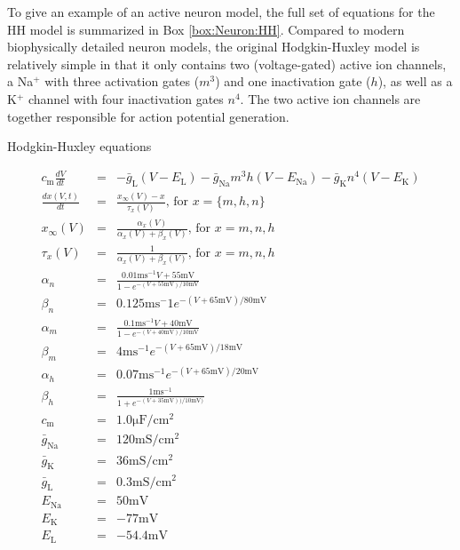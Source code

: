 To give an example of an active neuron model, the full set of equations for the HH model is summarized in Box \ref{box:Neuron:HH}. Compared to modern biophysically detailed neuron models, the original Hodgkin-Huxley model is relatively simple in that it only contains two (voltage-gated) active ion channels, a Na$^+$ with three activation gates ($m^3$) and one inactivation gate ($h$), as well as a K$^+$ channel with four inactivation gates $n^4$. The two active ion channels are together responsible for action potential generation.  

\begin{floatingbox}[h]
\caption{Hodgkin-Huxley equations}

\begin{eqnarray*}
    c_{\mathrm{m}} \frac{dV}{dt} & =  & -\bar{g}_{\mathrm{L}}(V-E_{\mathrm{L}}) - \bar{g}_{\mathrm{Na}} m^3 h (V - E_{\mathrm{Na}}) - \bar{g}_{\mathrm{K}} n^4 (V - E_{\mathrm{K}}) \\
    \frac{dx(V,t)}{dt} & = & \frac{x_{\infty}(V) - x}{\tau_x(V)},  \, \text{for } x = \{m,h,n\} \\ 
    x_{\infty}(V) &= & \frac{\alpha_x(V)}{\alpha_x(V) + \beta_x(V)}, \, \text{for } x = m,n,h \\ %
    \tau_x(V) & = & \frac{1}{\alpha_x(V) + \beta_x(V)}, \, \text{for } x = m,n,h \\ %
    \alpha_n &=& \frac{0.01 \mathrm{ms}^{-1} V+55 \mathrm{mV}}{1-e^{-(V+55 \mathrm{mV})/10 \mathrm{mV}}}  \\ %
     \beta_n &=& 0.125 \mathrm{ms}^-1 e^{-(V+65 \mathrm{mV})/80 \mathrm{mV}}   \\ %
     \alpha_m &=& \frac{0.1 \mathrm{ms}^{-1} V+ 40 \mathrm{mV}} {1-e^{-(V+40 \mathrm{mV})/10 \mathrm{mV}}}  \\   
     \beta_m &=& 4 \mathrm{ms}^{-1} e^{-(V+65  \mathrm{mV})/18 \mathrm{mV}}  \\ %
    \alpha_h &=& 0.07 \mathrm{ms}^{-1} e^{-(V+65 \mathrm{mV})/20 \mathrm{mV}}  \\ %
    \beta_h &=& \frac{1 \mathrm{ms}^{-1}}{1+e^{-(V+35 \mathrm{mV}))/10 \mathrm{mV})}}   \\ %
    c_\mathrm{m} &=& 1.0 \mathrm{\mu F/cm^2} \\ %
    \bar{g}_{\mathrm{Na}} &=& 120 \mathrm{mS/cm^2}\\ %
    \bar{g}_{\mathrm{K}} &=& 36 \mathrm{mS/cm^2} \\ %
    \bar{g}_{\mathrm{L}} &=& 0.3 \mathrm{mS/cm^2} \\ %
    E_{\mathrm{Na}} &=& 50 \mathrm{mV} \\ %
    E_{\mathrm{K}} &=& -77  \mathrm{mV} \\ %
    E_{\mathrm{L}} &=& -54.4 \mathrm{mV} \\ %
\end{eqnarray*}
\label{box:Neuron:HH}
\end{floatingbox}




